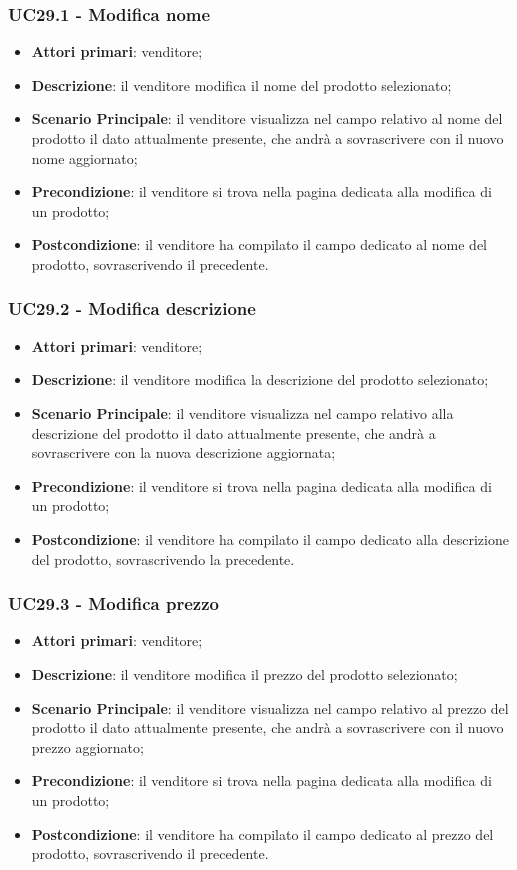 \subsubsection{UC29.1 - Modifica nome}
\begin{itemize}
\item \textbf{Attori primari}: venditore;
\item \textbf{Descrizione}: il venditore modifica il nome del prodotto selezionato;
\item \textbf{Scenario Principale}: il venditore visualizza nel campo relativo al nome del prodotto il dato attualmente presente, che andrà a sovrascrivere con il nuovo nome aggiornato;
\item \textbf{Precondizione}: il venditore si trova nella pagina dedicata alla modifica di un prodotto;
\item \textbf{Postcondizione}: il venditore ha compilato il campo dedicato al nome del prodotto, sovrascrivendo il precedente.
\end{itemize}

\subsubsection{UC29.2 - Modifica descrizione}
\begin{itemize}
\item \textbf{Attori primari}: venditore;
\item \textbf{Descrizione}: il venditore modifica la descrizione del prodotto selezionato;
\item \textbf{Scenario Principale}: il venditore visualizza nel campo relativo alla descrizione del prodotto il dato attualmente presente, che andrà a sovrascrivere con la nuova descrizione aggiornata;
\item \textbf{Precondizione}: il venditore si trova nella pagina dedicata alla modifica di un prodotto;
\item \textbf{Postcondizione}: il venditore ha compilato il campo dedicato alla descrizione del prodotto, sovrascrivendo la precedente.
\end{itemize}

\subsubsection{UC29.3 - Modifica prezzo}
\begin{itemize}
\item \textbf{Attori primari}: venditore;
\item \textbf{Descrizione}: il venditore modifica il prezzo del prodotto selezionato;
\item \textbf{Scenario Principale}: il venditore visualizza nel campo relativo al prezzo del prodotto il dato attualmente presente, che andrà a sovrascrivere con il nuovo prezzo aggiornato;
\item \textbf{Precondizione}: il venditore si trova nella pagina dedicata alla modifica di un prodotto;
\item \textbf{Postcondizione}: il venditore ha compilato il campo dedicato al prezzo del prodotto, sovrascrivendo il precedente.
\end{itemize}

